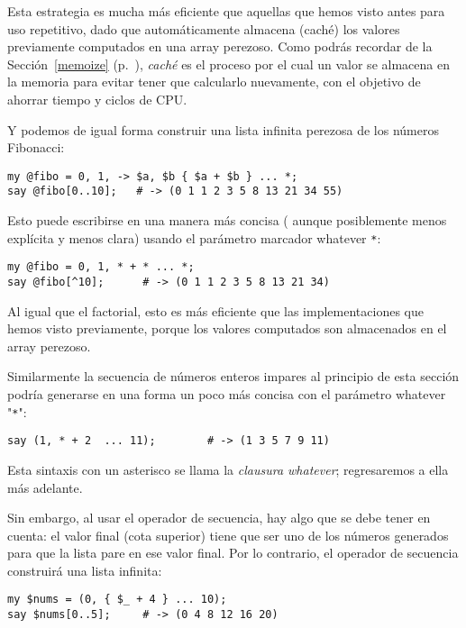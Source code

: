 Esta estrategia es mucha más eficiente que aquellas que hemos
visto antes para uso repetitivo, dado que automáticamente almacena
(caché) los valores previamente computados en una array perezoso.
Como podrás recordar de la Sección~\ref{memoize} 
(p.~\pageref{memoize}), \emph{caché} es el proceso por el cual
un valor se almacena en la memoria para evitar tener que calcularlo
nuevamente, con el objetivo de ahorrar tiempo y ciclos de CPU.

Y podemos de igual forma construir una lista infinita perezosa 
de los números Fibonacci:

\begin{verbatim}
my @fibo = 0, 1, -> $a, $b { $a + $b } ... *;
say @fibo[0..10];   # -> (0 1 1 2 3 5 8 13 21 34 55)
\end{verbatim}

Esto puede escribirse en una manera más concisa (
aunque posiblemente menos explícita y menos clara) usando
el parámetro marcador whatever \verb|*|:

\begin{verbatim}
my @fibo = 0, 1, * + * ... *;
say @fibo[^10];      # -> (0 1 1 2 3 5 8 13 21 34)
\end{verbatim}

Al igual que el factorial, esto es más eficiente que 
las implementaciones que hemos visto previamente, porque 
los valores computados son almacenados en el array perezoso.

Similarmente la secuencia de números enteros impares al principio
de esta sección podría generarse en una forma un poco más
concisa con el parámetro whatever "\verb|*|":

\begin{verbatim}
say (1, * + 2  ... 11);        # -> (1 3 5 7 9 11)
\end{verbatim}

Esta sintaxis con un asterisco se llama la \emph{clausura whatever};
regresaremos a ella más adelante.

Sin embargo, al usar el operador de secuencia, hay algo que se
debe tener en cuenta: el valor final (cota superior) tiene que ser uno de los
números generados para que la lista pare en ese valor final. Por lo
contrario, el operador de secuencia construirá una lista infinita:

\begin{verbatim}
my $nums = (0, { $_ + 4 } ... 10);
say $nums[0..5];     # -> (0 4 8 12 16 20)
\end{verbatim}

